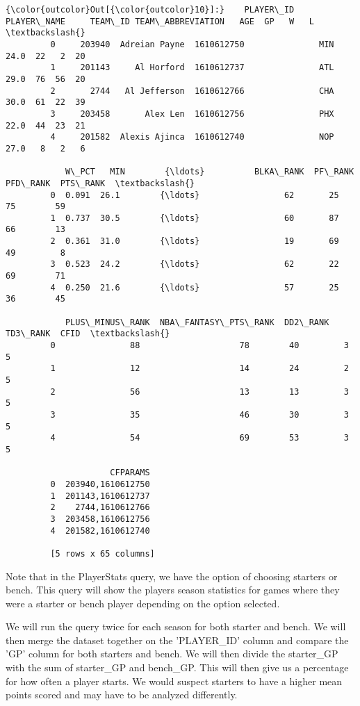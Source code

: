\documentclass[11pt]{article}
\begin{document}
\begin{Verbatim}[commandchars=\\\{\}]
{\color{outcolor}Out[{\color{outcolor}10}]:}    PLAYER\_ID    PLAYER\_NAME     TEAM\_ID TEAM\_ABBREVIATION   AGE  GP   W   L  \textbackslash{}
         0     203940  Adreian Payne  1610612750               MIN  24.0  22   2  20   
         1     201143     Al Horford  1610612737               ATL  29.0  76  56  20   
         2       2744   Al Jefferson  1610612766               CHA  30.0  61  22  39   
         3     203458       Alex Len  1610612756               PHX  22.0  44  23  21   
         4     201582  Alexis Ajinca  1610612740               NOP  27.0   8   2   6   
         
            W\_PCT   MIN        {\ldots}          BLKA\_RANK  PF\_RANK  PFD\_RANK  PTS\_RANK  \textbackslash{}
         0  0.091  26.1        {\ldots}                 62       25        75        59   
         1  0.737  30.5        {\ldots}                 60       87        66        13   
         2  0.361  31.0        {\ldots}                 19       69        49         8   
         3  0.523  24.2        {\ldots}                 62       22        69        71   
         4  0.250  21.6        {\ldots}                 57       25        36        45   
         
            PLUS\_MINUS\_RANK  NBA\_FANTASY\_PTS\_RANK  DD2\_RANK  TD3\_RANK  CFID  \textbackslash{}
         0               88                    78        40         3     5   
         1               12                    14        24         2     5   
         2               56                    13        13         3     5   
         3               35                    46        30         3     5   
         4               54                    69        53         3     5   
         
                     CFPARAMS  
         0  203940,1610612750  
         1  201143,1610612737  
         2    2744,1610612766  
         3  203458,1610612756  
         4  201582,1610612740  
         
         [5 rows x 65 columns]
\end{Verbatim}
            
    Note that in the PlayerStats query, we have the option of choosing
starters or bench. This query will show the players season statistics
for games where they were a starter or bench player depending on the
option selected.

We will run the query twice for each season for both starter and bench.
We will then merge the dataset together on the 'PLAYER\_ID' column and
compare the 'GP' column for both starters and bench. We will then divide
the starter\_GP with the sum of starter\_GP and bench\_GP. This will
then give us a percentage for how often a player starts. We would
suspect starters to have a higher mean points scored and may have to be
analyzed differently.
\end{document}
